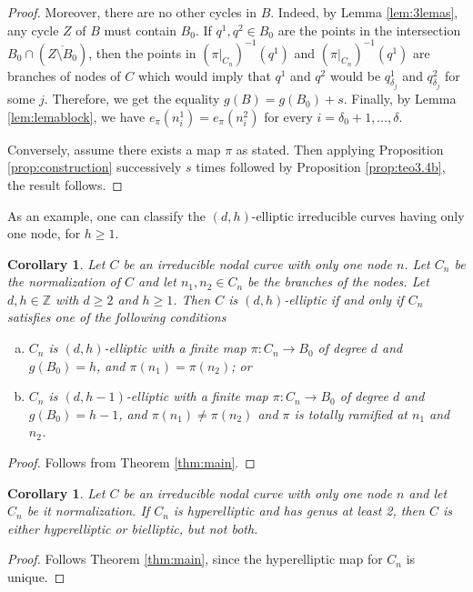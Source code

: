 \documentclass{article}
\newtheorem{corollary}[theorem]{Corollary}
\renewcommand{\:}{\colon }
\begin{document}
\begin{proof}
Moreover, there are no other cycles in $B$. Indeed, by Lemma \ref{lem:3lemas}, any cycle $Z$ of $B$ must contain $B_0$. If $q^1,q^2\in B_0$ are the points in the intersection 
$B_0\cap (\overline{Z\setminus B_0})$, then the points in 
$(\pi|_{C_n})^{-1}(q^1)$ and $(\pi|_{C_n})^{-1}(q^1)$ 
are branches of nodes of $C$ which would imply that $q^1$ and $q^2$ would be $q^1_{\delta_j}$
and $q^2_{\delta_j}$ for some $j$. 
Therefore, we get the equality $g(B)= g(B_0)+s$. 
Finally, by Lemma \ref{lem:lemablock}, we have 
$e_{\pi}(n_i^1)=e_{\pi}(n_i^2)$
for every $i=\delta_0+1,\ldots,\delta$.



Conversely, assume there exists a map $\pi$ as stated. Then applying Proposition \ref{prop:construction} successively $s$ times followed by Proposition \ref{prop:teo3.4b},
 the result follows.
\end{proof}

As an example, one can classify the $(d,h)$-elliptic irreducible curves having only one node, for $h\geq 1$.

\begin{corollary}\label{cor:cor1} 
Let $C$ be an irreducible nodal curve with only one node $n$.
Let $C_n$ be the normalization of $C$ and let $n_1,n_2\in C_n$ be the branches of the nodes.
Let $d,h\in\mathbb Z$ with $d\geq 2$ and $h\geq 1$.
Then $C$ is $(d,h)$-elliptic if and only if $C_n$ satisfies one of the following conditions
\begin{enumerate}[(a)]
\item $C_n$ is $(d,h)$-elliptic with 
a finite map  $\pi:C_n\rightarrow B_0$ of degree $d$ and $g(B_0)={h}$, and $\pi(n_1)=\pi(n_2)$; or\
\item $C_n$ is $(d,h-1)$-elliptic with 
a finite map  $\pi:C_n\rightarrow B_0$ of degree $d$ and $g(B_0)={h-1}$, and $\pi(n_1)\neq\pi(n_2)$ and $\pi$ is totally ramified at  $n_1$ and $n_2$.
\end{enumerate}
\end{corollary}
\begin{proof}
Follows from  Theorem \ref{thm:main}.
\end{proof}


\begin{corollary}\label{cor:cor2} 
Let $C$ be an irreducible nodal curve with only one node $n$ and let $C_n$ be it normalization.
If $C_n$ is hyperelliptic and has genus at least 2, then $C$ is either hyperelliptic or bielliptic, but not both.
\end{corollary}
\begin{proof}
Follows Theorem \ref{thm:main}, since the hyperelliptic map  for $C_n$ is unique.
\end{proof}



\printbibliography
\end{document}
